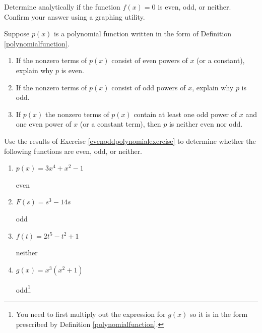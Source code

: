 \documentclass{ximera}
\begin{document}
\begin{problem}\label{evenoddornotpolylast}
Determine analytically if the function $f(x) =0$ is even, odd, or neither.  Confirm your answer using a graphing utility.  

\end{problem}

\begin{problem}\label{evenoddpolynomialexercise}
Suppose $p(x)$ is a polynomial function written in the form of  Definition \ref{polynomialfunction}.

\begin{enumerate}

\item  If the nonzero terms of $p(x)$ consist of even powers of $x$ (or a constant), explain why $p$ is even.

\item   If the nonzero terms of $p(x)$ consist of odd powers of $x$, explain why $p$ is odd.

\item  If $p(x)$ the nonzero terms of $p(x)$  contain at least one odd power of $x$ and one even power of $x$ (or a constant term), then $p$ is neither even nor odd.

\end{enumerate}
\end{problem}


\begin{problem}
Use the results of Exercise \ref{evenoddpolynomialexercise} to determine whether the following functions are even, odd, or neither.

\begin{enumerate}
    \item $p(x) = 3x^4 + x^2 - 1$
    
\begin{solution}
    even
\end{solution}

    \item $F(s) = s^3 - 14s$
    
\begin{solution}
    odd
\end{solution}

    \item $f(t) = 2t^5 - t^2 + 1$
    
\begin{solution}
    neither
\end{solution}

    \item $g(x) =x^3(x^2+1)$
    
\begin{solution}
    odd\footnote{You need to first multiply out the expression for $g(x)$ so it is in the form prescribed by Definition \ref{polynomialfunction}.}
\end{solution}
    
\end{enumerate}
\end{problem}
\end{document}
